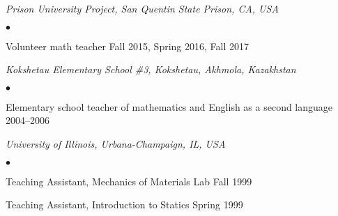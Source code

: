 \documentclass[margin,line]{res}
\newenvironment{list2}{
  \begin{list}{$\bullet$}{%
      \setlength{\itemsep}{0in}
      \setlength{\parsep}{0in} \setlength{\parskip}{0in}
      \setlength{\topsep}{0in} \setlength{\partopsep}{0in}
      \setlength{\leftmargin}{0.2in}}}{\end{list}}
\begin{document}
\begin{resume}
\emph{Prison University Project, San Quentin State Prison, CA, USA}
\begin{list2}
\item Volunteer math teacher
\hfill Fall 2015, Spring 2016, Fall 2017
\end{list2}

\emph{Kokshetau Elementary School \#3, Kokshetau, Akhmola, Kazakhstan}
\begin{list2}
\item Elementary school teacher of mathematics and English as a second language
\hfill 2004--2006
\end{list2}

\emph{University of Illinois, Urbana-Champaign, IL, USA}
\begin{list2}
\item Teaching Assistant, Mechanics of Materials Lab \hfill Fall 1999
\item Teaching Assistant, Introduction to Statics \hfill Spring 1999
\end{list2}

\end{resume}
\end{document}
